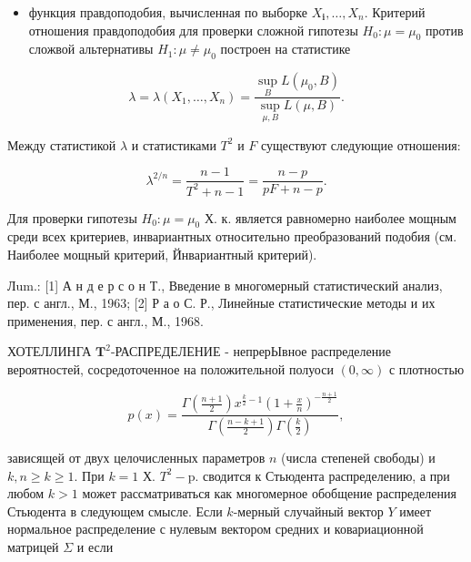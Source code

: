\documentclass[10pt]{article}
\begin{document}
\begin{itemize}

  \item функция правдоподобия, вычисленная по выборке $X_{\mathbf{i}}, \ldots, X_{n}$. Критерий отношения правдоподобия для проверки сложной гипотезы $H_{0}: \mu=\mu_{0}$ против сложвой альтернативы $H_{1}: \mu \neq \mu_{0}$ построен на статистике

\end{itemize}



\[

\lambda=\lambda\left(X_{1}, \ldots, X_{n}\right)=\frac{\sup _{B} L\left(\mu_{0}, B\right)}{\sup _{\mu, B} L(\mu, B)} .

\]



Между статистикой $\lambda$ и статистиками $T^{2}$ и $F$ существуют следующие отношения:



\[

\lambda^{2 / n}=\frac{n-1}{T^{2}+n-1}=\frac{n-p}{p F+n-p} .

\]



Для проверки гипотезы $H_{0}: \mu=\mu_{0}$ Х. к. является равномерно наиболее мощным среди всех критериев, инвариантных относительно преобразований подобия (см. Наиболее мощный критерий, Йнвариантный критерий).



Лum.: [1] А н д е р с о н Т., Введение в многомерный статистический анализ, пер. с англ., М., 1963; [2] Р а о С. Р., Линейные статистические методы и их применения, пер. с англ., М., 1968.



ХОТЕЛЛИНГА $\boldsymbol{T}^{2}$-РАСПРЕДЕЛЕНИЕ - непрерЫвное распределение вероятностей, сосредоточенное на положительной полуоси $(0, \infty)$ с плотностью



\[

p(x)=\frac{\Gamma\left(\frac{n+1}{2}\right) x^{\frac{k}{2}-1}\left(1+\frac{x}{n}\right)^{-\frac{n+1}{2}}}{\Gamma\left(\frac{n-k+1}{2}\right) \Gamma\left(\frac{k}{2}\right)},

\]



зависящей от двух целочисленных параметров $n$ (числа степеней свободы) и $k, n \geqslant k \geqslant 1$. При $k=1$ Х. $T^{2}-\mathrm{p}$. сводится к Стьюдента распределению, а при любом $k>1$ может рассматриваться как многомерное обобщение распределения Стьюдента в следующем смысле. Если $k$-мерный случайный вектор $Y$ имеет нормальное распределение с нулевым вектором средних и ковариационной матрицей $\Sigma$ и если
\end{document}
